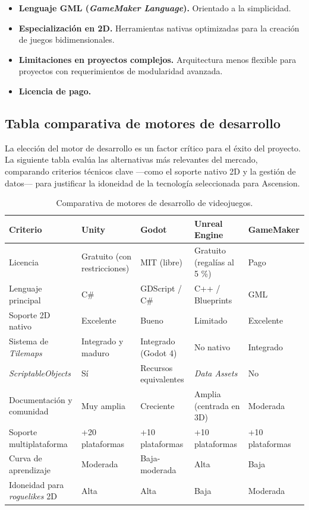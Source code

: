 \begin{itemize}
\item \textbf{Lenguaje GML (\textit{GameMaker Language}).} Orientado a la simplicidad.
\item \textbf{Especialización en 2D.} Herramientas nativas optimizadas para la creación de juegos bidimensionales.
\item \textbf{Limitaciones en proyectos complejos.} Arquitectura menos flexible para proyectos con requerimientos de modularidad avanzada.
\item \textbf{Licencia de pago.}
\end{itemize}

\subsection{Tabla comparativa de motores de desarrollo}

La elección del motor de desarrollo es un factor crítico para el éxito del proyecto. La siguiente tabla evalúa las alternativas más relevantes del mercado, comparando criterios técnicos clave —como el soporte nativo 2D y la gestión de datos— para justificar la idoneidad de la tecnología seleccionada para Ascension.

\begin{table}[H]
\centering
{\small
\begin{tabular}{|p{}|p{}|p{}|p{}|p{}|}
\hline
\textbf{Criterio} & \textbf{Unity} & \textbf{Godot} & \textbf{Unreal Engine} & \textbf{GameMaker} \\ \hline
Licencia & Gratuito (con restricciones) & MIT (libre) & Gratuito (regalías al 5 \%) & Pago \\ \hline
Lenguaje principal & C\# & GDScript / C\# & C++ / Blueprints & GML \\ \hline
Soporte 2D nativo & Excelente & Bueno & Limitado & Excelente \\ \hline
Sistema de \textit{Tilemaps} & Integrado y maduro & Integrado (Godot 4) & No nativo & Integrado \\ \hline
\textit{ScriptableObjects} & Sí & Recursos equivalentes & \textit{Data Assets} & No \\ \hline
Documentación y comunidad & Muy amplia & Creciente & Amplia (centrada en 3D) & Moderada \\ \hline
Soporte multiplataforma & +20 plataformas & +10 plataformas & +10 plataformas & +10 plataformas \\ \hline
Curva de aprendizaje & Moderada & Baja-moderada & Alta & Baja \\ \hline
Idoneidad para \textit{roguelikes} 2D & Alta & Alta & Baja & Moderada \\ \hline
\end{tabular}
}
\caption{Comparativa de motores de desarrollo de videojuegos.}
\end{table}

